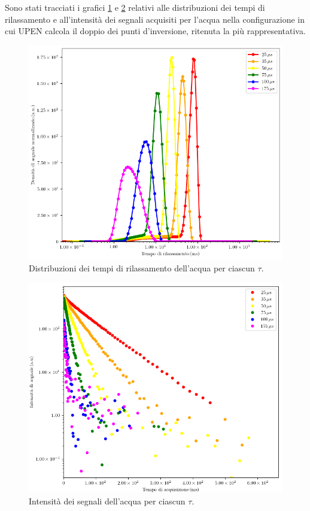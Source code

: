 Sono stati tracciati i grafici \ref{fig:D_h2o} e \ref{fig:S_h2o} relativi alle distribuzioni dei tempi di rilassamento e all'intensità dei segnali acquisiti per l'acqua nella configurazione in cui UPEN calcola il doppio dei punti d'inversione, ritenuta la più rappresentativa.

\begin{figure}[h!]
\centering
\includegraphics[scale=0.3]{Figure/H2O.png}
\caption{Distribuzioni dei tempi di rilassamento dell'acqua per ciascun $\tau$.}
\label{fig:D_h2o}
\end{figure}

\begin{figure}[h!]
\centering
\includegraphics[scale=0.3]{Figure/H2O_SigTSig.png}
\caption{Intensità dei segnali dell'acqua per ciascun $\tau$.}
\label{fig:S_h2o}
\end{figure}

